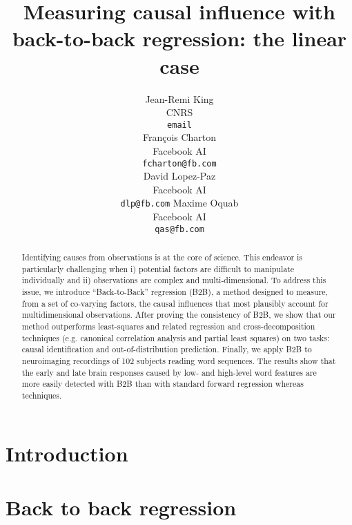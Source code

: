 \documentclass{article}
\title{Measuring causal influence with\\ back-to-back regression: the linear case}
\author{%
  Jean-Remi King\\
  CNRS\\
  \texttt{email} \\
  \And
  Fran\c{c}ois Charton\\
  Facebook AI\\
  \texttt{fcharton@fb.com}\\
  \And
  David Lopez-Paz\\
  Facebook AI\\
  \texttt{dlp@fb.com}
  \And
  Maxime Oquab\\
  Facebook AI\\
  \texttt{qas@fb.com}
}
\begin{document}
\maketitle

\begin{abstract}
Identifying causes from observations is at the core of science. This endeavor
is particularly challenging when i) potential factors are difficult to
manipulate individually and ii) observations are complex and multi-dimensional.
To address this issue, we introduce ``Back-to-Back'' regression (B2B), a
method designed to measure, from a set of co-varying factors, the causal
influences that most plausibly account for multidimensional observations. After
proving the consistency of B2B, we show that our method outperforms
least-squares and related regression and cross-decomposition techniques (e.g.
canonical correlation analysis and partial least squares) on two tasks: causal
identification and out-of-distribution prediction. Finally, we apply B2B to
neuroimaging recordings of 102 subjects reading word sequences. The results
show that the early and late brain responses caused by low- and high-level
word features are more easily detected with B2B than with standard forward
regression whereas techniques.
\end{abstract}

\section{Introduction}



\section{Back to back regression}
\label{sec:algorithm}
\end{document}
